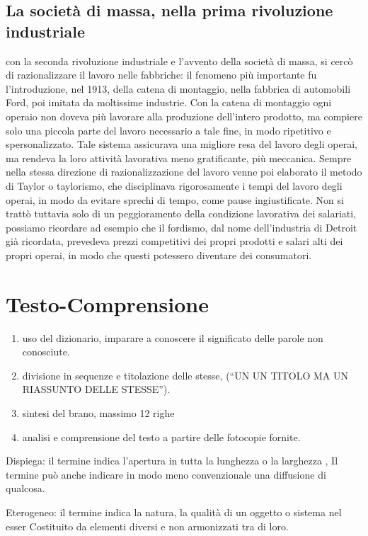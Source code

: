\documentclass{article}
\begin{document}
\subsection{La società di massa, nella prima rivoluzione industriale}

con la seconda rivoluzione industriale e l'avvento della società di massa, 
si cercò di razionalizzare il lavoro nelle fabbriche: il fenomeno più importante
fu l'introduzione, nel 1913, della catena di montaggio, nella fabbrica di automobili
Ford, poi imitata da moltissime industrie. Con la catena di montaggio ogni operaio
non doveva più lavorare alla produzione dell'intero prodotto, ma compiere solo una
piccola parte del lavoro necessario a tale fine, in modo ripetitivo e spersonalizzato.
Tale sistema assicurava una migliore resa del lavoro degli operai, ma rendeva la loro
attività lavorativa meno gratificante, più meccanica.
Sempre nella stessa direzione di razionalizzazione del lavoro venne poi elaborato il metodo
di Taylor o taylorismo, che disciplinava rigorosamente i tempi del lavoro degli operai, in
modo da evitare sprechi di tempo, come pause ingiustificate.
Non si trattò tuttavia solo di un peggioramento della condizione lavorativa dei salariati,
possiamo ricordare ad esempio che il fordismo, dal nome dell'industria di Detroit già
ricordata, prevedeva prezzi competitivi dei propri prodotti e salari alti dei propri
operai, in modo che questi potessero diventare dei consumatori.
 
\section{Testo-Comprensione}
\begin{enumerate}
  \item uso del dizionario, imparare a conoscere il significato delle parole non conosciute.
  \item divisione in sequenze e titolazione delle stesse, (“UN UN TITOLO MA UN RIASSUNTO DELLE STESSE”).
  \item sintesi del brano, massimo 12 righe
  \item analisi e comprensione del testo a partire delle fotocopie fornite.
\end{enumerate}
\vspace{2cm}

Dispiega: il termine indica l’apertura in tutta la lunghezza o la larghezza ,
Il termine può anche indicare in modo meno convenzionale una diffusione di qualcosa.

Eterogeneo: il termine indica la natura, la qualità di un oggetto o sistema nel esser 
Costituito da elementi diversi e non armonizzati tra di loro.
\end{document}
